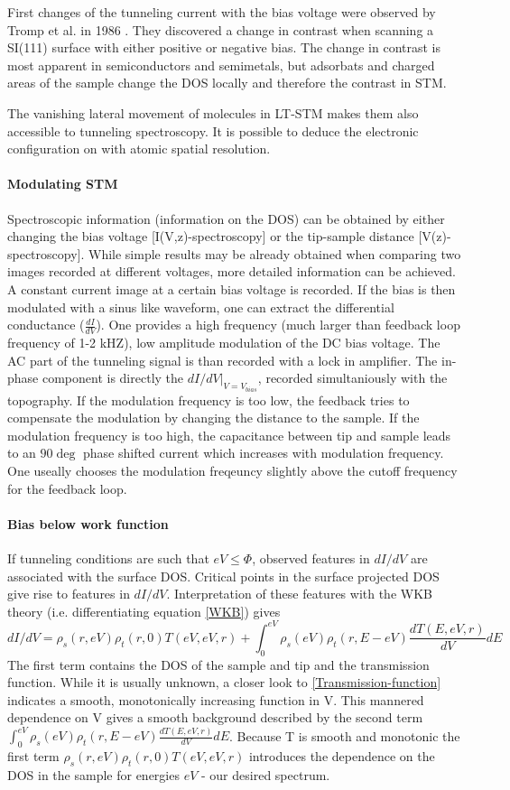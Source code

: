 \label{section:STS}
First changes of the tunneling current with the bias voltage were observed by Tromp et al. in 1986 \cite{tromp_atomic_1986}. They discovered a change in contrast when scanning a SI(111) surface with either positive or negative bias. The change in contrast is most apparent in semiconductors and semimetals\cite{bonnell_scanning_1993}, but adsorbats and charged areas of the sample change the DOS locally and therefore the contrast in STM.

The vanishing lateral movement of molecules in LT-STM makes them also accessible to tunneling spectroscopy. It is possible to deduce the electronic configuration on with atomic spatial resolution.
\paragraph{Modulating STM}
Spectroscopic information (information on the DOS) can be obtained by either changing the bias voltage [I(V,z)-spectroscopy] or the tip-sample distance [V(z)-spectroscopy].
While simple results may be already obtained when comparing two images recorded at different voltages, more detailed information can be achieved. A constant current image at a certain bias voltage is recorded. If the bias is then modulated with a sinus like waveform, one can extract the differential conductance ($\frac{dI}{dV}$). 
One provides a high frequency (much larger than feedback loop frequency of 1-2 kHZ), low amplitude modulation of the DC bias voltage. The AC part of the tunneling signal is than recorded with a lock in amplifier. The in-phase component is directly the $dI/dV|_{V=V_{bias}}$, recorded simultaniously with the topography. If the modulation frequency is too low, the feedback tries to compensate the modulation by changing the distance to the sample.
If the modulation frequency is too high, the capacitance between tip and sample leads to an $90\deg$ phase shifted current which increases with modulation frequency. One useally chooses the modulation freqeuncy slightly above the cutoff frequency for the feedback loop.

\paragraph{Bias below work function}
If tunneling conditions are such that $eV\leq\Phi$, observed features in $dI/dV$ are associated with the surface DOS. Critical points in the surface projected DOS give rise to features in $dI/dV$. Interpretation of these features with the WKB theory (i.e. differentiating equation \eqref{WKB}) gives
$$dI/dV=\rho_s(r,eV)\rho_t(r,0)T(eV,eV,r)+\int_0^{eV}\rho_s(eV)\rho_t(r,E-eV)\frac{dT(E,eV,r)}{dV}dE$$
The first term contains the DOS of the sample and tip and the transmission function. While it is usually unknown, a closer look to \eqref{Transmission-function} indicates a smooth, monotonically increasing function in V. This mannered dependence on V gives a smooth background described by the second term $\int_0^{eV}\rho_s(eV)\rho_t(r,E-eV)\frac{dT(E,eV,r)}{dV}dE$.
Because T is smooth and monotonic the first term $\rho_s(r,eV)\rho_t(r,0)T(eV,eV,r)$ introduces the dependence on the DOS in the sample for energies $eV$ - our desired spectrum.


